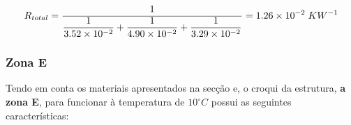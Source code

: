 \documentclass[12pt, a4paper]{article}
\begin{document}
\begin{equation}
    R_{total} = \dfrac{1}{
        \dfrac{1}{
            3.52 \times 10^{-2}
        }
        +
        \dfrac{1}{
            4.90 \times 10^{-2}
        }
        +
        \dfrac{1}{
            3.29 \times 10^{-2}
        }
    }
    = 1.26 \times 10^{-2} \hspace{1mm} KW^{-1}
    \label{eq:zona_d_total}
\end{equation}




\subsubsection{Zona E}\label{ssub:Zona E}

Tendo em conta os materiais apresentados na secção e, o croqui da estrutura, \textbf{a zona E}, para funcionar
à temperatura de $ 10^\circ C $ possui as seguintes características:
\end{document}

